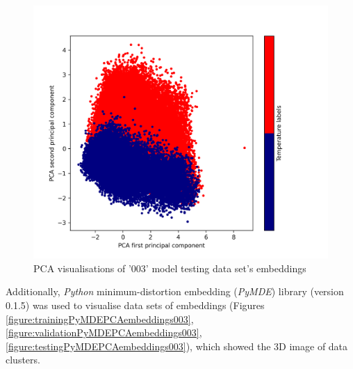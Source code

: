 \documentclass[12pt]{article}
\begin{document}
	\begin{figure}[h!]
		\centering
		\includegraphics[scale=0.65]{003_test_v2_PCA.png}

		\caption{PCA visualisations of '003' model testing
		data set's embeddings}
		\label{figure:testingScikitPCAembeddings003}
	\end{figure}
	
	Additionally, \textit{Python} minimum-distortion embedding (\textit{PyMDE}) 
	library (version 0.1.5) was used to visualise data sets of embeddings 
	(Figures \ref{figure:trainingPyMDEPCAembeddings003},
	\ref{figure:validationPyMDEPCAembeddings003},
	\ref{figure:testingPyMDEPCAembeddings003}), which showed the 3D image
	of data clusters.
\end{document}
